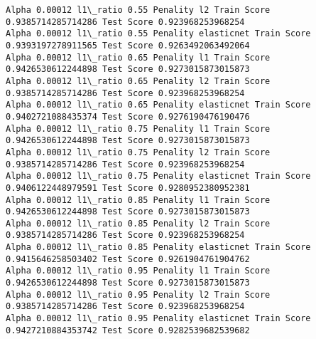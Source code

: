 \documentclass[11pt]{article}
\begin{document}
\begin{Verbatim}[commandchars=\\\{\}]
Alpha 0.00012 l1\_ratio 0.55 Penality l2 Train Score 0.9385714285714286 Test Score 0.923968253968254
Alpha 0.00012 l1\_ratio 0.55 Penality elasticnet Train Score 0.9393197278911565 Test Score 0.9263492063492064
Alpha 0.00012 l1\_ratio 0.65 Penality l1 Train Score 0.9426530612244898 Test Score 0.9273015873015873
Alpha 0.00012 l1\_ratio 0.65 Penality l2 Train Score 0.9385714285714286 Test Score 0.923968253968254
Alpha 0.00012 l1\_ratio 0.65 Penality elasticnet Train Score 0.9402721088435374 Test Score 0.9276190476190476
Alpha 0.00012 l1\_ratio 0.75 Penality l1 Train Score 0.9426530612244898 Test Score 0.9273015873015873
Alpha 0.00012 l1\_ratio 0.75 Penality l2 Train Score 0.9385714285714286 Test Score 0.923968253968254
Alpha 0.00012 l1\_ratio 0.75 Penality elasticnet Train Score 0.9406122448979591 Test Score 0.9280952380952381
Alpha 0.00012 l1\_ratio 0.85 Penality l1 Train Score 0.9426530612244898 Test Score 0.9273015873015873
Alpha 0.00012 l1\_ratio 0.85 Penality l2 Train Score 0.9385714285714286 Test Score 0.923968253968254
Alpha 0.00012 l1\_ratio 0.85 Penality elasticnet Train Score 0.9415646258503402 Test Score 0.9261904761904762
Alpha 0.00012 l1\_ratio 0.95 Penality l1 Train Score 0.9426530612244898 Test Score 0.9273015873015873
Alpha 0.00012 l1\_ratio 0.95 Penality l2 Train Score 0.9385714285714286 Test Score 0.923968253968254
Alpha 0.00012 l1\_ratio 0.95 Penality elasticnet Train Score 0.9427210884353742 Test Score 0.9282539682539682

    \end{Verbatim}
\end{document}
